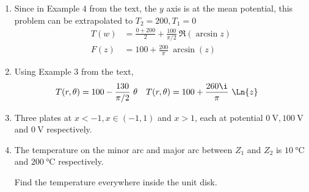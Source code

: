 \begin{enumerate}
    \item Since in Example $ 4 $ from the text, the $ y $ axis is at the mean potential,
          this problem can be extrapolated to $ T_2 = 200, T_1 = 0 $
          \begin{align}
              T(w) & = \frac{0 + 200}{2} + \frac{100}{\pi/2}\ \Re(\arcsin z) \\
              F(z) & = 100 + \frac{200}{\pi}\ \arcsin(z)
          \end{align}

    \item Using Example $ 3 $ from the text,
          \begin{align}
              T(r, \theta) & = 100 - \frac{130}{\pi/2}\ \theta &
              T(r, \theta) & = 100 + \frac{260\i}{\pi}\ \Ln{z}
          \end{align}

    \item Three plates at $ x < -1, x \in (-1, 1) $ and $ x > 1 $, each at
          potential $ \SI{0}{\V}, \SI{100}{\V} $ and $ \SI{0}{\V} $ respectively.

    \item The temperature on the minor arc and major arc between $ Z_1 $ and $ Z_2 $ is
          $ \SI{10}{\celsius} $ and $ \SI{200}{\celsius} $ respectively. \par
          Find the temperature everywhere inside the unit disk.

\end{enumerate}